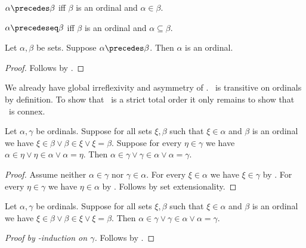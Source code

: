 \begin{abbreviation}\label{ordinal_prec}
    $\alpha \precedes \beta$ iff
    $\beta$ is an ordinal and
    $\alpha\in\beta$.
\end{abbreviation}

\begin{abbreviation}\label{ordinal_preceq}
    $\alpha\precedeseq \beta$ iff $\beta$ is an ordinal and $\alpha\subseteq\beta$.
\end{abbreviation}

\begin{lemma}\label{prec_is_ordinal}
    Let $\alpha,\beta$ be sets.
    Suppose $\alpha\precedes \beta$.
    Then $\alpha$ is an ordinal.
\end{lemma}
\begin{proof}
    Follows by .
\end{proof}

We already have global irreflexivity and asymmetry of \in.
\in\ is transitive on ordinals by definition.
To show that \in\ is a strict total order it only remains to show that \in\ is connex.

\begin{lemma}\label{ordinal_elem_connex_from_elements}
    Let $\alpha,\gamma$ be ordinals.
    Suppose for all sets $\xi,\beta$ such that $\xi\in\alpha$ and $\beta$ is an ordinal
    we have $\xi\in\beta\lor \beta\in\xi \lor \xi = \beta$.
    Suppose for every $\eta\in\gamma$
    we have $\alpha\in\eta\lor \eta\in\alpha \lor \alpha = \eta$.
    Then $\alpha\in\gamma\lor \gamma\in\alpha \lor \alpha = \gamma$.
\end{lemma}
\begin{proof}
    Assume neither $\alpha\in\gamma$ nor $\gamma\in\alpha$.
    For every $\xi\in\alpha$ we have $\xi\in\gamma$
        by .
    For every $\eta\in\gamma$ we have $\eta\in\alpha$
        by .
    Follows by set extensionality.
\end{proof}

\begin{lemma}\label{ordinal_elem_connex_step}
    Let $\alpha,\gamma$ be ordinals.
    Suppose for all sets $\xi,\beta$ such that $\xi\in\alpha$ and $\beta$ is an ordinal
    we have $\xi\in\beta\lor \beta\in\xi \lor \xi = \beta$.
    Then $\alpha\in\gamma\lor \gamma\in\alpha \lor \alpha = \gamma$.
\end{lemma}
\begin{proof}[Proof by \in-induction on $\gamma$]
    Follows by .
\end{proof}

